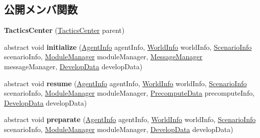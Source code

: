 \subsection*{公開メンバ関数}
\begin{DoxyCompactItemize}
\item 
\hypertarget{classadf_1_1component_1_1tactics_1_1center_1_1TacticsCenter_a1d0c7a4a40337bac348ed34245f7cdc8}{}\label{classadf_1_1component_1_1tactics_1_1center_1_1TacticsCenter_a1d0c7a4a40337bac348ed34245f7cdc8} 
{\bfseries Tactics\+Center} (\hyperlink{classadf_1_1component_1_1tactics_1_1center_1_1TacticsCenter}{Tactics\+Center} parent)
\item 
\hypertarget{classadf_1_1component_1_1tactics_1_1center_1_1TacticsCenter_a67fab2cd7720c35a40061fbbf704e05b}{}\label{classadf_1_1component_1_1tactics_1_1center_1_1TacticsCenter_a67fab2cd7720c35a40061fbbf704e05b} 
abstract void {\bfseries initialize} (\hyperlink{classadf_1_1agent_1_1info_1_1AgentInfo}{Agent\+Info} agent\+Info, \hyperlink{classadf_1_1agent_1_1info_1_1WorldInfo}{World\+Info} world\+Info, \hyperlink{classadf_1_1agent_1_1info_1_1ScenarioInfo}{Scenario\+Info} scenario\+Info, \hyperlink{classadf_1_1agent_1_1module_1_1ModuleManager}{Module\+Manager} module\+Manager, \hyperlink{classadf_1_1agent_1_1communication_1_1MessageManager}{Message\+Manager} message\+Manager, \hyperlink{classadf_1_1agent_1_1develop_1_1DevelopData}{Develop\+Data} develop\+Data)
\item 
\hypertarget{classadf_1_1component_1_1tactics_1_1center_1_1TacticsCenter_afd8bf28e492bc0503a62c564ac604716}{}\label{classadf_1_1component_1_1tactics_1_1center_1_1TacticsCenter_afd8bf28e492bc0503a62c564ac604716} 
abstract void {\bfseries resume} (\hyperlink{classadf_1_1agent_1_1info_1_1AgentInfo}{Agent\+Info} agent\+Info, \hyperlink{classadf_1_1agent_1_1info_1_1WorldInfo}{World\+Info} world\+Info, \hyperlink{classadf_1_1agent_1_1info_1_1ScenarioInfo}{Scenario\+Info} scenario\+Info, \hyperlink{classadf_1_1agent_1_1module_1_1ModuleManager}{Module\+Manager} module\+Manager, \hyperlink{classadf_1_1agent_1_1precompute_1_1PrecomputeData}{Precompute\+Data} precompute\+Info, \hyperlink{classadf_1_1agent_1_1develop_1_1DevelopData}{Develop\+Data} develop\+Data)
\item 
\hypertarget{classadf_1_1component_1_1tactics_1_1center_1_1TacticsCenter_aedfb474f3c6487a591672ca08131aa47}{}\label{classadf_1_1component_1_1tactics_1_1center_1_1TacticsCenter_aedfb474f3c6487a591672ca08131aa47} 
abstract void {\bfseries preparate} (\hyperlink{classadf_1_1agent_1_1info_1_1AgentInfo}{Agent\+Info} agent\+Info, \hyperlink{classadf_1_1agent_1_1info_1_1WorldInfo}{World\+Info} world\+Info, \hyperlink{classadf_1_1agent_1_1info_1_1ScenarioInfo}{Scenario\+Info} scenario\+Info, \hyperlink{classadf_1_1agent_1_1module_1_1ModuleManager}{Module\+Manager} module\+Manager, \hyperlink{classadf_1_1agent_1_1develop_1_1DevelopData}{Develop\+Data} develop\+Data)

\end{DoxyCompactItemize}
